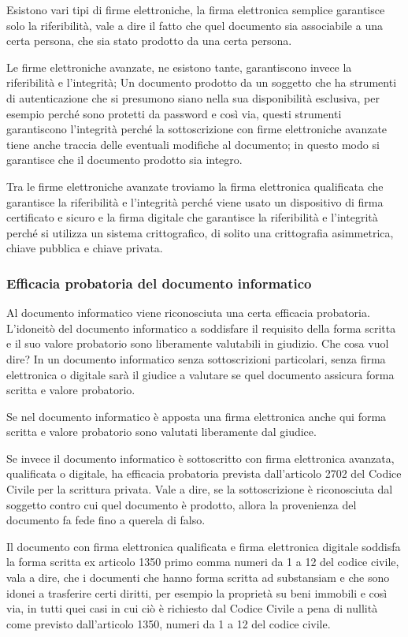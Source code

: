 Esistono vari tipi di firme elettroniche, la firma elettronica semplice garantisce solo la riferibilità, vale a dire il fatto che quel documento sia associabile a una certa persona, che sia stato prodotto da una certa persona. 

Le firme elettroniche avanzate, ne esistono tante, garantiscono invece la riferibilità e l'integrità; 
Un documento prodotto da un soggetto che ha strumenti di autenticazione che si presumono siano nella sua disponibilità esclusiva, per esempio perché sono protetti da password e così via, questi strumenti  garantiscono l'integrità perché la sottoscrizione con firme elettroniche avanzate tiene anche traccia delle eventuali modifiche al documento; in questo modo si garantisce che il documento prodotto sia integro. 

Tra le firme elettroniche avanzate troviamo la firma elettronica qualificata che garantisce la riferibilità e l'integrità perché viene usato un dispositivo di firma certificato e sicuro e la firma digitale che garantisce la riferibilità e l'integrità perché si utilizza un sistema crittografico, di solito una crittografia asimmetrica, chiave pubblica e chiave privata. 

\subsubsection{Efficacia probatoria del documento informatico}
Al documento informatico viene riconosciuta una certa efficacia probatoria.
L'idoneitò del documento informatico a soddisfare il requisito della forma scritta e il suo valore probatorio sono liberamente valutabili in giudizio. Che cosa vuol dire? In un documento informatico senza sottoscrizioni particolari, senza firma elettronica o digitale sarà il giudice a valutare se quel documento assicura forma scritta e valore probatorio. 

Se nel documento informatico è apposta una firma elettronica anche qui forma scritta e valore probatorio sono valutati liberamente dal giudice. 

Se invece il documento informatico è sottoscritto con firma elettronica avanzata, qualificata o digitale, ha efficacia probatoria prevista dall'articolo 2702 del Codice Civile per la scrittura privata. Vale a dire, se la sottoscrizione è riconosciuta dal soggetto contro cui quel documento è prodotto, allora la provenienza del documento fa fede fino a querela di falso. 

Il documento con firma elettronica qualificata e firma elettronica digitale soddisfa la forma scritta ex articolo 1350 primo comma numeri da 1 a 12 del codice civile, vala a dire, che i documenti che hanno forma scritta ad substansiam e che sono idonei a trasferire certi diritti, per esempio la proprietà su beni immobili e così via, in tutti quei casi in cui ciò è richiesto dal Codice Civile a pena di nullità come previsto dall'articolo 1350, numeri da 1 a 12 del codice civile. 

